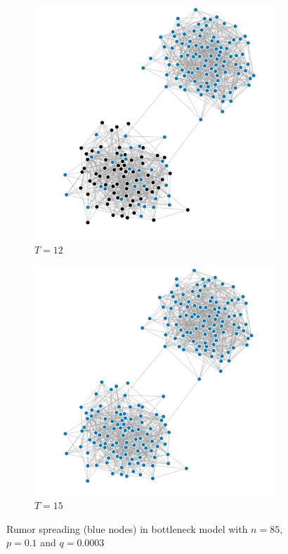 \documentclass[10pt,journal,a4paper]{IEEEtran}
\begin{document}
\begin{figure}[h]
\begin{subfigure}[b]{.5\linewidth}
\includegraphics[width=1\linewidth]{figs/split-3}
\caption{$T=12$}
\end{subfigure}%
\begin{subfigure}[b]{.5\linewidth}
\includegraphics[width=1\linewidth]{figs/split-4}
\caption{$T=15$}
\end{subfigure}

\caption{Rumor spreading (blue nodes) in bottleneck model with $n=85$, $p = 0.1$ and $q = 0.0003$}
\label{barabasi-albert-graphs}
\end{figure}
\end{document}
